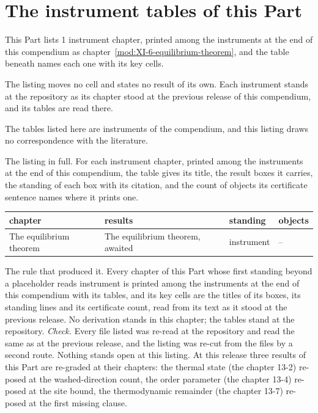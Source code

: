 \section{The instrument tables of this Part}\label{mod:XIII-L-the-instrument-tables-at-the-repository}
\begin{chtable}\label{box:XIII-L-the-instrument-tables-at-the-repository:1}
This Part lists 1 instrument chapter, printed among the instruments at the end of this compendium as chapter~\ref{mod:XI-6-equilibrium-theorem}, and the table beneath names each one with its key cells.
\end{chtable}
The listing moves no cell and states no result of its own. Each instrument stands at the repository as its chapter stood at the previous release of this compendium, and its tables are read there.
\begin{chbridge}
The tables listed here are instruments of the compendium, and this listing draws no correspondence with the literature.
\end{chbridge}
\begin{chproof}[instrument]
The listing in full. For each instrument chapter, printed among the instruments at the end of this compendium, the table gives its title, the result boxes it carries, the standing of each box with its citation, and the count of objects its certificate sentence names where it prints one.
{\small
\begin{longtable}{p{38mm}p{63mm}p{30mm}p{14mm}}
\hline
chapter & results & standing & objects \\
\hline
\endhead
The equilibrium theorem & The equilibrium theorem, awaited & instrument & -- \\
\hline
\end{longtable}
}
The rule that produced it. Every chapter of this Part whose first standing beyond a placeholder reads instrument is printed among the instruments at the end of this compendium with its tables, and its key cells are the titles of its boxes, its standing lines and its certificate count, read from its text as it stood at the previous release.
No derivation stands in this chapter; the tables stand at the repository.
\emph{Check.} Every file listed was re-read at the repository and read the same as at the previous release, and the listing was re-cut from the files by a second route.
Nothing stands open at this listing. At this release three results of this Part are re-graded at their chapters: the thermal state (the chapter 13-2) re-posed at the washed-direction count, the order parameter (the chapter 13-4) re-posed at the site bound, the thermodynamic remainder (the chapter 13-7) re-posed at the first missing clause.
\end{chproof}
\label{chend:XIII-L-the-instrument-tables-at-the-repository}
